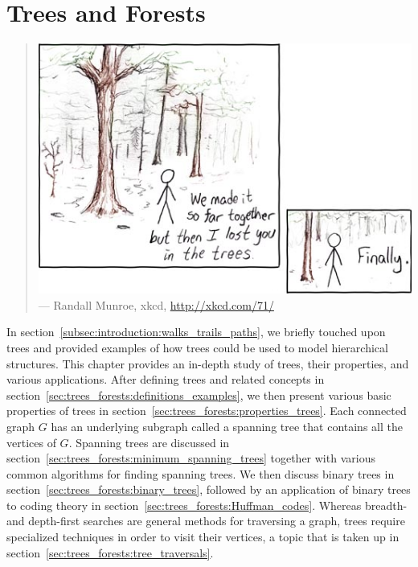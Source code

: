 
\chapter{Trees and Forests}
\label{chap:trees_forests}

\begin{quote}
\footnotesize
\includegraphics[scale=3]{image/trees-forests/in-the-trees.png} \\
\noindent
--- Randall Munroe, xkcd,
\url{http://xkcd.com/71/}
\end{quote}

\noindent
In section~\ref{subsec:introduction:walks_trails_paths}, we briefly
touched upon trees and provided examples of how trees
could be used to model hierarchical
structures. This chapter provides an in-depth study of
trees, their properties, and various applications. After
defining trees and related concepts in
section~\ref{sec:trees_forests:definitions_examples}, we then present
various basic properties of trees in
section~\ref{sec:trees_forests:properties_trees}. Each connected graph
$G$ has an underlying subgraph called a spanning tree that contains
all the vertices of $G$. Spanning trees are discussed in
section~\ref{sec:trees_forests:minimum_spanning_trees} together with
various common algorithms for finding spanning trees. We then discuss
binary trees in section~\ref{sec:trees_forests:binary_trees}, followed
by an application of binary trees to coding theory in
section~\ref{sec:trees_forests:Huffman_codes}. Whereas breadth- and
depth-first searches are general methods for traversing a graph, trees
require specialized techniques in order to visit their vertices, a
topic that is taken up in section~\ref{sec:trees_forests:tree_traversals}.


